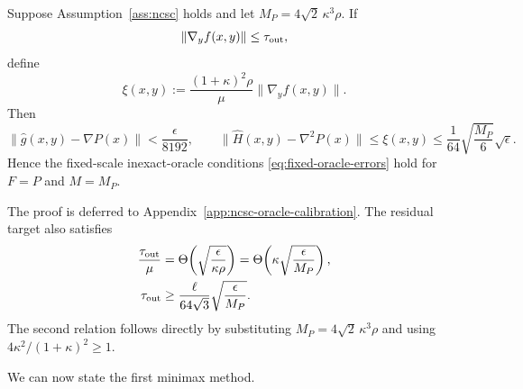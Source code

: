 \begin{corollary}
\label{cor:ncsc-fixed-oracle}
Suppose Assumption~\ref{ass:ncsc} holds and let
$M_P=4\sqrt2\,\kappa^3\rho$.
If
\begin{equation}
    \|\nabla_yf(x,y)\|
    \le
    \tau_{\rm out},
    \label{eq:outer-residual-condition}
\end{equation}
define
\begin{equation}
    \xi(x,y)
    :=
    \frac{(1+\kappa)^2\rho}{\mu}
    \|\nabla_yf(x,y)\|.
    \label{eq:ncsc-hessian-certificate}
\end{equation}
Then
\begin{equation}
    \|\widehat g(x,y)-\nabla P(x)\|
    <
    \frac{\epsilon}{8192},
    \qquad
    \|\widehat H(x,y)-\nabla^2P(x)\|
    \le
    \xi(x,y)
    \le
    \frac{1}{64}
    \sqrt{\frac{M_P}{6}}\sqrt\epsilon.
    \label{eq:ncsc-fixed-oracle-errors}
\end{equation}
Hence the fixed-scale inexact-oracle conditions
\eqref{eq:fixed-oracle-errors} hold for
$F=P$ and $M=M_P$.
\end{corollary}

The proof is deferred to Appendix~\ref{app:ncsc-oracle-calibration}.
The residual target also satisfies
\begin{subequations}
\label{eq:outer-residual-scale}
\begin{align}
    \frac{\tau_{\rm out}}{\mu}
    &=
    \Theta\!\left(
        \sqrt{\frac{\epsilon}{\kappa\rho}}
    \right)
    =
    \Theta\!\left(
        \kappa\sqrt{\frac{\epsilon}{M_P}}
    \right),
    \label{eq:outer-residual-distance-scale}
    \\
    \tau_{\rm out}
    &\ge
    \frac{\ell}{64\sqrt3}
    \sqrt{\frac{\epsilon}{M_P}}.
    \label{eq:outer-residual-lower}
\end{align}
\end{subequations}
The second relation follows directly by substituting
$M_P=4\sqrt2\,\kappa^3\rho$ and using
$4\kappa^2/(1+\kappa)^2\ge1$.

We can now state the first minimax method.

